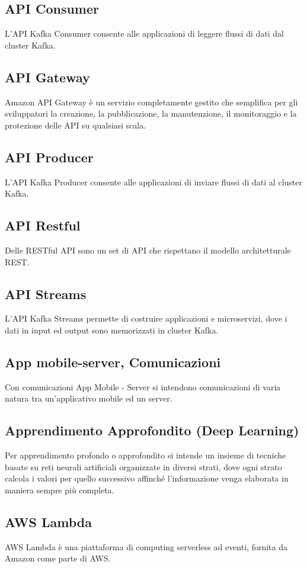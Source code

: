 \subsection{API Consumer}  L'API Kafka Consumer consente alle applicazioni di leggere flussi di dati dal cluster Kafka.
\subsection{API Gateway}  Amazon API Gateway è un servizio completamente gestito che semplifica per gli sviluppatori la creazione, la pubblicazione, la manutenzione, il monitoraggio e la protezione delle API su qualsiasi scala.
\subsection{API Producer}  L'API Kafka Producer consente alle applicazioni di inviare flussi di dati al cluster Kafka.
\subsection{API Restful}  Delle RESTful API sono un set di API che rispettano il modello architetturale REST.
\subsection{API Streams}  L'API Kafka Streams permette di costruire applicazioni e microservizi, dove i dati in input ed output sono memorizzati in cluster Kafka.
\subsection{App mobile-server, Comunicazioni}  Con comunicazioni App Mobile - Server si intendono comunicazioni di varia natura tra un'applicativo mobile ed un server.
\subsection{Apprendimento Approfondito (Deep Learning)}  Per apprendimento profondo o approfondito si intende un insieme di tecniche basate su reti neurali artificiali organizzate in diversi strati, dove ogni strato calcola i valori per quello successivo affinché l'informazione venga elaborata in maniera sempre più completa.
\subsection{AWS Lambda}  AWS Lambda è una piattaforma di computing serverless ad eventi, fornita da Amazon come parte di AWS.
